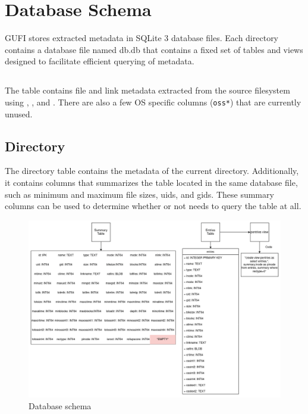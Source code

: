 \section{Database Schema}
\label{sec:schema}
GUFI stores extracted metadata in SQLite 3 database files. Each
directory contains a database file named db.db that contains a fixed
set of tables and views designed to facilitate efficient querying of
metadata.

\subsection{\entries}
The \entries table contains file and link metadata extracted from the
source filesystem using \stat, \readlink, and \listxattr. There are
also a few OS specific columns (\texttt{oss*}) that are currently
unused.

\subsection{Directory \summary}
The directory \summary table contains the metadata of the current
directory. Additionally, it contains columns that summarizes the
\entries table located in the same database file, such as minimum and
maximum file sizes, uids, and gids. These summary columns can be used
to determine whether or not \querydb needs to query the \entries table
at all.

\begin{figure} [h]
\centering
\includegraphics[width=1.0\textwidth]{images/Database_Schemas.png}
\caption{\label{fig:Database Schema}Database schema}
\end{figure}

